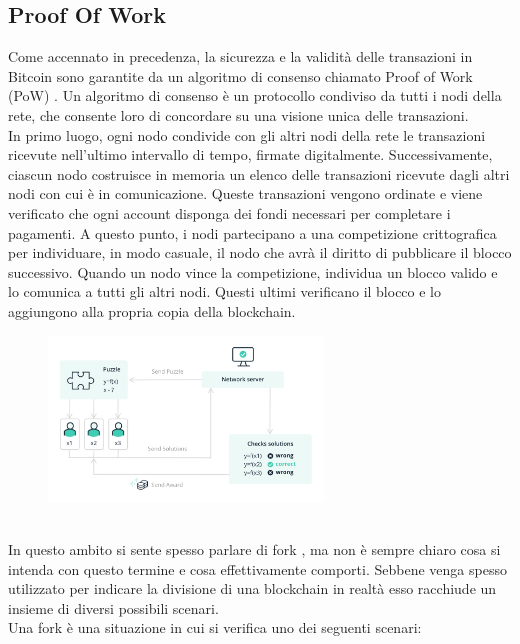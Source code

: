 \subsection{Proof Of Work}
Come accennato in precedenza, la sicurezza e la validità delle transazioni in Bitcoin sono garantite da un algoritmo di consenso chiamato Proof of Work (PoW) \cite{Blockchain_guida_allecosistema}. Un algoritmo di consenso è un protocollo condiviso da tutti i nodi della rete, che consente loro di concordare su una visione unica delle transazioni.
\\In primo luogo, ogni nodo condivide con gli altri nodi della rete le transazioni ricevute nell’ultimo intervallo di tempo, firmate digitalmente. Successivamente, ciascun nodo costruisce in memoria un elenco delle transazioni ricevute dagli altri nodi con cui è in comunicazione. Queste transazioni vengono ordinate e viene verificato che ogni account disponga dei fondi necessari per completare i pagamenti.
A questo punto, i nodi partecipano a una competizione crittografica per individuare, in modo casuale, il nodo che avrà il diritto di pubblicare il blocco successivo. Quando un nodo vince la competizione, individua un blocco valido e lo comunica a tutti gli altri nodi. Questi ultimi verificano il blocco e lo aggiungono alla propria copia della blockchain.
\begin{figure}[h]
\centering
\includegraphics[width=0.65\textwidth]{Immagini/proof of work scheme.jpg}
\end{figure}
\\
In questo ambito si sente spesso parlare di fork \cite{Blockchain_tecnologia_e_applicazioni_per_il_business}, ma non è sempre chiaro cosa si intenda con questo termine e cosa effettivamente comporti. Sebbene venga spesso utilizzato per indicare la divisione di una blockchain in realtà esso racchiude un insieme di diversi possibili scenari. 
\\Una fork è una situazione in cui si verifica uno dei seguenti scenari:
